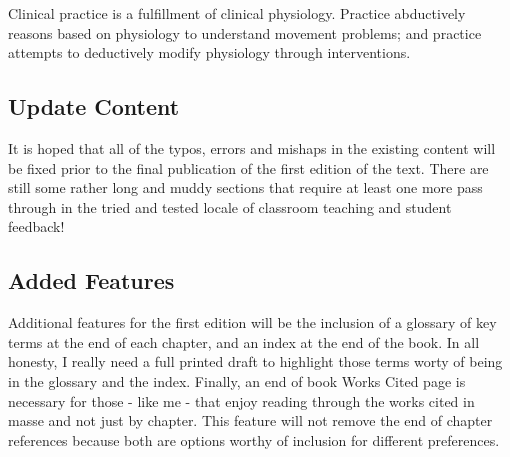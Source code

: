Clinical practice is a fulfillment of clinical physiology. Practice abductively reasons based on physiology to understand movement problems; and practice attempts to deductively modify physiology through interventions.

\subsection*{Update Content}

It is hoped that all of the typos, errors and mishaps in the existing content will be fixed prior to the final publication of the first edition of the text. There are still some rather long and muddy sections that require at least one more pass through in the tried and tested locale of classroom teaching and student feedback!

\subsection*{Added Features}

Additional features for the first edition will be the inclusion of a glossary of key terms at the end of each chapter, and an index at the end of the book. In all honesty, I really need a full printed draft to highlight those terms worty of being in the glossary and the index.
Finally, an end of book Works Cited page is necessary for those - like me - that enjoy reading through the works cited in masse and not just by chapter. This feature will not remove the end of chapter references because both are options worthy of inclusion for different preferences.
